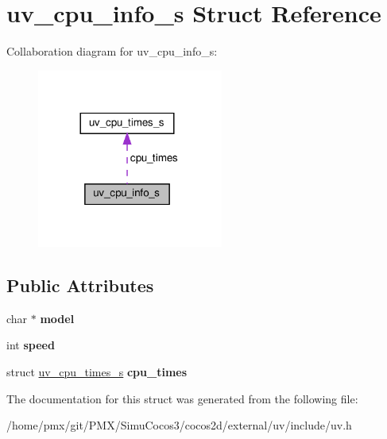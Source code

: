 \hypertarget{structuv__cpu__info__s}{}\section{uv\+\_\+cpu\+\_\+info\+\_\+s Struct Reference}
\label{structuv__cpu__info__s}


Collaboration diagram for uv\+\_\+cpu\+\_\+info\+\_\+s\+:
\nopagebreak
\begin{figure}[H]
\begin{center}
\leavevmode
\includegraphics[width=173pt]{structuv__cpu__info__s__coll__graph}
\end{center}
\end{figure}
\subsection*{Public Attributes}
\begin{DoxyCompactItemize}
\item 
\mbox{\label{structuv__cpu__info__s_a995077774282ac2e950f4ef89eab9d76}} 
char $\ast$ {\bfseries model}
\item 
\mbox{\label{structuv__cpu__info__s_adb5b84db11553642c327eda45d1cc7e6}} 
int {\bfseries speed}
\item 
\mbox{\label{structuv__cpu__info__s_a1e3750e94f916ffd3249352e02092e2c}} 
struct \hyperlink{structuv__cpu__times__s}{uv\+\_\+cpu\+\_\+times\+\_\+s} {\bfseries cpu\+\_\+times}
\end{DoxyCompactItemize}


The documentation for this struct was generated from the following file\+:\begin{DoxyCompactItemize}
\item 
/home/pmx/git/\+P\+M\+X/\+Simu\+Cocos3/cocos2d/external/uv/include/uv.\+h\end{DoxyCompactItemize}
